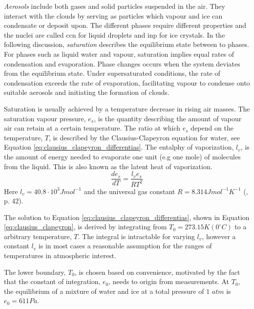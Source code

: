 \textit{Aerosols} include both gases and solid particles suspended in the air. They interact with the clouds by serving as particles which vapour and ice can condensate or deposit upon. The different phases require different properties and the nuclei are called \acrfull{ccn} for liquid droplets and \acrfull{inp} for ice crystals. 
In the following discussion, \textit{saturation} describes the equilibrium state between to phases. %
For phases such as liquid water and vapour, saturation implies equal rates of condensation and evaporation. Phase changes occurs when the system deviates from the equilibrium state. Under supersaturated conditions, the rate of condensation exceeds the rate of evaporation, facilitating vapour to condense onto suitable aerosols and initiating the formation of clouds. 

Saturation is usually achieved by a temperature decrease in rising air masses. The saturation vapour pressure, $e_s$, is the quantity describing the amount of vapour air can retain at a certain temperature. The ratio at which $e_s$ depend on the temperature, $T$, is described by the Clausius-Clapeyron equation for water, see Equation \eqref{eq:clausius_clapeyron_differentias}. The entalphy of vaporization, $l_v$, is the amount of energy needed to evaporate one unit (e.g one mole) of molecules from the liquid. This is also known as the latent heat of vaporization. 
\begin{equation} \label{eq:clausius_clapeyron_differentias}
    \frac{de_s}{dT} = \frac{l_v e_s}{R T^2}
\end{equation}
Here $l_v = 40.8 \cdot 10^3 J mol^{-1}$ and the universal gas constant $R= 8.314 J mol^{-1} K^{-1}$ (\cite{cloud_phys_book_johanne}, p. 42). 

The solution to Equation \eqref{eq:clausius_clapeyron_differentias}, shown in Equation \eqref{eq:clausius_clapeyron}, is derived by integrating from $T_0 = 273.15K \left(0 ^{\circ}C \right)$ to a arbitrary temperature, $T$. The integral is intractable for varying $l_v$, however a constant $l_v$ is in most cases a reasonable assumption for the ranges of temperatures in atmospheric interest.

The lower boundary, $T_0$, is chosen based on convenience, motivated by the fact that the constant of integration,  $e_0$, needs to origin from measurements. At $T_0$, the equilibrium of a mixture of water and ice at a total pressure of $1$ $atm$ is $e_0 = 611Pa$. 

